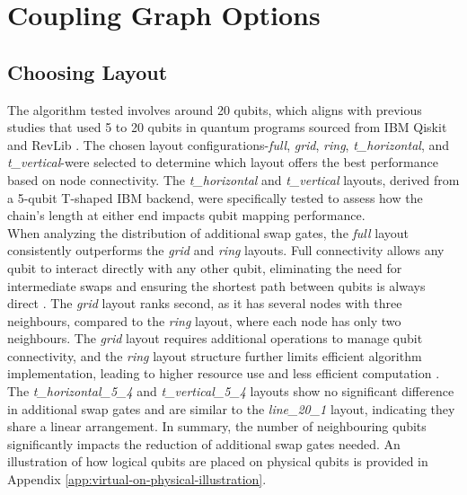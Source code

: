 \section{Coupling Graph Options} %
\subsection{Choosing Layout}
The algorithm tested involves around 20 qubits, which aligns with previous studies \cite{li_tackling_2019, zhu_dynamic_2020} that used 5 to 20 qubits in quantum programs sourced from IBM Qiskit \cite{siraichi_qubit_2018, zulehner_efficient_2018} and RevLib \cite{wille_revlib_2008}. The chosen layout configurations-\textit{full}, \textit{grid}, \textit{ring}, \textit{t\_horizontal}, and \textit{t\_vertical}-were selected to determine which layout offers the best performance based on node connectivity. The \textit{t\_horizontal} and \textit{t\_vertical} layouts, derived from a 5-qubit T-shaped IBM backend, were specifically tested to assess how the chain's length at either end impacts qubit mapping performance. \\
When analyzing the distribution of additional swap gates, the \textit{full} layout consistently outperforms the \textit{grid} and \textit{ring} layouts. Full connectivity allows any qubit to interact directly with any other qubit, eliminating the need for intermediate swaps and ensuring the shortest path between qubits is always direct \cite{hayes_graph_2000}. The \textit{grid} layout ranks second, as it has several nodes with three neighbours, compared to the \textit{ring} layout, where each node has only two neighbours. The \textit{grid} layout requires additional operations to manage qubit connectivity, and the \textit{ring} layout structure further limits efficient algorithm implementation, leading to higher resource use and less efficient computation \cite{peham_optimal_2023}. The \textit{t\_horizontal\_5\_4} and \textit{t\_vertical\_5\_4} layouts show no significant difference in additional swap gates and are similar to the \textit{line\_20\_1} layout, indicating they share a linear arrangement. In summary, the number of neighbouring qubits significantly impacts the reduction of additional swap gates needed. An illustration of how logical qubits are placed on physical qubits is provided in Appendix \ref{app:virtual-on-physical-illustration}. \\
